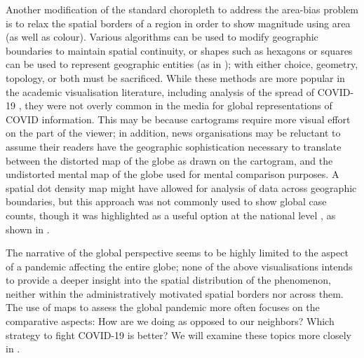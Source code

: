 \documentclass[article]{jdssv}\usepackage[]{graphicx}\usepackage[]{color}
\begin{document}
Another modification of the standard choropleth to address the area-bias problem is to relax the spatial borders of a region in order to show magnitude using area (as well as colour). Various algorithms can be used to modify geographic boundaries to maintain spatial continuity, or shapes such as hexagons or squares can be used to represent geographic entities (as in ); with either choice, geometry, topology, or both must be sacrificed.  While these methods are more popular in the academic visualisation literature, including analysis of the spread of COVID-19 \citep{yalcinMappingGlobalSpatiotemporal2022}, they were not overly common in the media for global representations of COVID information. This may be because cartograms require more visual effort on the part of the viewer; in addition, news organisations may be reluctant to assume their readers have the geographic sophistication necessary to translate between the distorted map of the globe as drawn on the cartogram, and the undistorted mental map of the globe used for mental comparison purposes. 
A spatial dot density map might have allowed for analysis of data across geographic boundaries, but this approach was not commonly used to show global case counts, though it was highlighted as a useful option at the national level \citep{fieldMappingCoronavirusResponsibly}, as shown in .

The narrative of the global perspective seems to be highly limited to the aspect of a pandemic affecting the entire globe; none of the above visualisations intends to provide a deeper insight into the spatial distribution of the phenomenon, neither within the administratively motivated spatial borders nor across them. 
The use of maps to assess the global pandemic more often focuses on the comparative aspects: How are we doing as opposed to our neighbors? Which strategy to fight COVID-19 is better? 
We will examine these topics more closely in .
\end{document}
